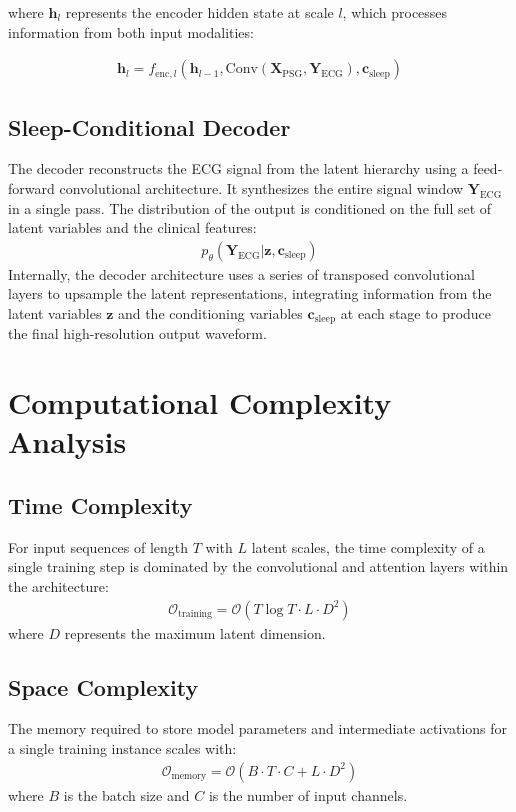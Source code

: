 \documentclass[11pt,en]{elegantpaper}
\begin{document}
where $\mathbf{h}_l$ represents the encoder hidden state at scale $l$, which processes information from both input modalities:

\begin{align}
\mathbf{h}_l = f_{\text{enc},l}(\mathbf{h}_{l-1}, \text{Conv}(\mathbf{X}_{\text{PSG}}, \mathbf{Y}_{\text{ECG}}), \mathbf{c}_{\text{sleep}})
\end{align}

\subsection{Sleep-Conditional Decoder}

The decoder reconstructs the ECG signal from the latent hierarchy using a feed-forward convolutional architecture. It synthesizes the entire signal window $\mathbf{Y}_{\text{ECG}}$ in a single pass. The distribution of the output is conditioned on the full set of latent variables and the clinical features:
\begin{align}
p_\theta(\mathbf{Y}_{\text{ECG}} | \mathbf{z}, \mathbf{c}_{\text{sleep}})
\end{align}
Internally, the decoder architecture uses a series of transposed convolutional layers to upsample the latent representations, integrating information from the latent variables $\mathbf{z}$ and the conditioning variables $\mathbf{c}_{\text{sleep}}$ at each stage to produce the final high-resolution output waveform.

\section{Computational Complexity Analysis}

\subsection{Time Complexity}
For input sequences of length $T$ with $L$ latent scales, the time complexity of a single training step is dominated by the convolutional and attention layers within the architecture:
\begin{align}
\mathcal{O}_{\text{training}} = \mathcal{O}(T \log T \cdot L \cdot D^2)
\end{align}
where $D$ represents the maximum latent dimension.

\subsection{Space Complexity}
The memory required to store model parameters and intermediate activations for a single training instance scales with:
\begin{align}
\mathcal{O}_{\text{memory}} = \mathcal{O}(B \cdot T \cdot C + L \cdot D^2)
\end{align}
where $B$ is the batch size and $C$ is the number of input channels.
\end{document}
